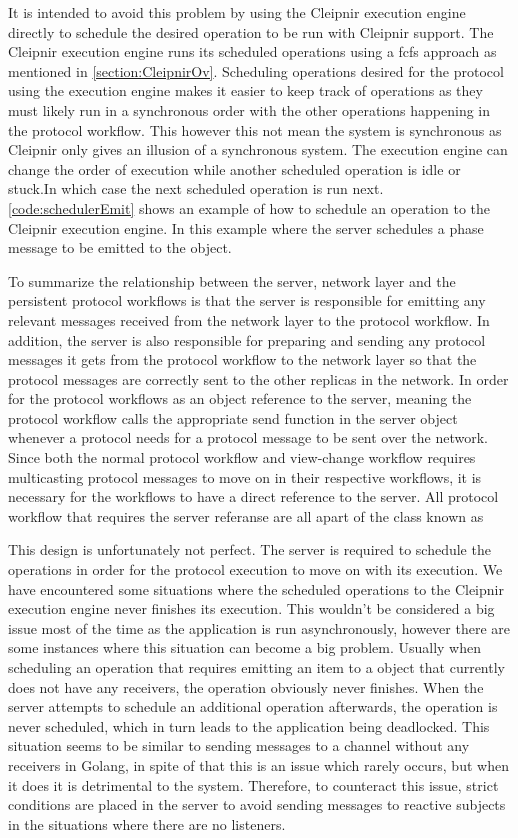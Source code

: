 It is intended to avoid this problem by using the Cleipnir execution engine directly to schedule the desired operation to be run with Cleipnir support. The Cleipnir execution engine runs its scheduled operations using a \ac{fcfs} approach as mentioned in \autoref{section:CleipnirOv}. Scheduling operations desired for the protocol using the execution engine makes it easier to keep track of operations as they must likely run in a synchronous order with the other operations happening in the protocol workflow. This however this not mean the system is synchronous as Cleipnir only gives an illusion of a synchronous system. The execution engine can change the order of execution while another scheduled operation is idle or stuck.In which case the next scheduled operation is run next. \autoref{code:schedulerEmit} shows an example of how to schedule an operation to the Cleipnir execution engine. In this example where the server schedules a phase message to be emitted to the   object.

To summarize the relationship between the server, network layer and the persistent protocol workflows is that the server is responsible for emitting any relevant messages received from the network layer to the protocol workflow. In addition, the server is also responsible for preparing and sending any protocol messages it gets from the protocol workflow to the network layer so that the protocol messages are correctly sent to the other replicas in the network. In order for the protocol workflows as an object reference to the server, meaning the protocol workflow calls the appropriate send function in the server object whenever a protocol needs for a protocol message to be sent over the network. Since both the normal protocol workflow and view-change workflow requires multicasting protocol messages to move on in their respective workflows, it is necessary for the workflows to have a direct reference to the server. All protocol workflow that requires the server referanse are all apart of the class known as  

This design is unfortunately not perfect. The server is required to schedule the operations in order for the protocol execution to move on with its execution. We have encountered some situations where the scheduled operations to the Cleipnir execution engine never finishes its execution. This wouldn’t be considered a big issue most of the time as the application is run asynchronously, however there are some instances where this situation can become a big problem. Usually when scheduling an operation that requires emitting an item to a  object that currently does not have any receivers, the operation obviously never finishes. When the server attempts to schedule an additional operation afterwards, the operation is never scheduled, which in turn leads to the application being deadlocked. This situation seems to be similar to sending messages to a channel without any receivers in Golang\cite{WEB:golangChannels}, in spite of that this is an issue which rarely occurs, but when it does it is detrimental to the system. Therefore, to counteract this issue, strict conditions are placed in the server to avoid sending messages to reactive subjects in the situations where there are no listeners.


